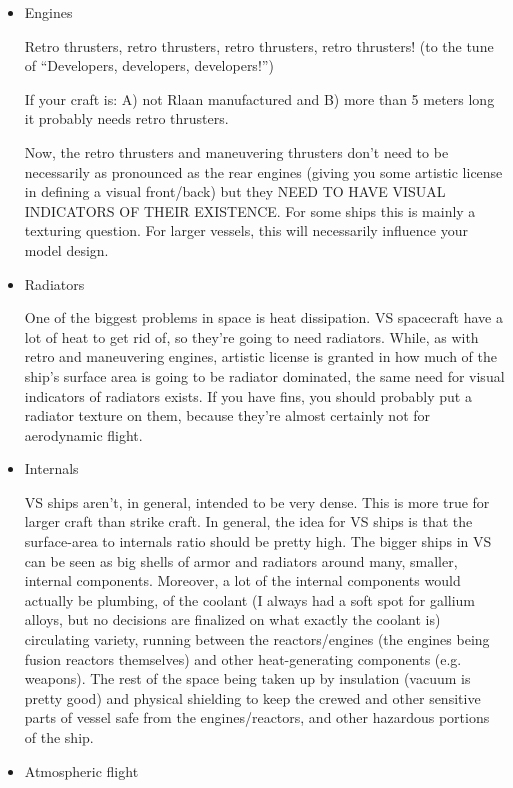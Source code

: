 \begin{itemize}
\item Engines

Retro thrusters, retro thrusters, retro thrusters, retro thrusters!
(to the tune of ``Developers, developers, developers!'')

If your craft is: A) not Rlaan manufactured and B) more than 5 meters
long it probably needs retro thrusters.

Now, the retro thrusters and maneuvering thrusters don't need to be
necessarily as pronounced as the rear engines (giving you some
artistic license in defining a visual front/back) but they NEED TO
HAVE VISUAL INDICATORS OF THEIR EXISTENCE. For some ships this is
mainly a texturing question. For larger vessels, this will necessarily
influence your model design.  

\item Radiators

One of the biggest problems in space is heat dissipation. VS
spacecraft have a lot of heat to get rid of, so they're going to need
radiators. While, as with retro and maneuvering engines, artistic
license is granted in how much of the ship's surface area is going to
be radiator dominated, the same need for visual indicators of
radiators exists. If you have fins, you should probably put a radiator
texture on them, because they're almost certainly not for aerodynamic
flight.  

\item Internals

VS ships aren't, in general, intended to be very dense. This is more
true for larger craft than strike craft. In general, the idea for VS
ships is that the surface-area to internals ratio should be pretty
high. The bigger ships in VS can be seen as big shells of armor and
radiators around many, smaller, internal components. Moreover, a lot
of the internal components would actually be plumbing, of the coolant
(I always had a soft spot for gallium alloys, but no decisions are
finalized on what exactly the coolant is) circulating variety, running
between the reactors/engines (the engines being fusion reactors
themselves) and other heat-generating components (e.g. weapons). The
rest of the space being taken up by insulation (vacuum is pretty good)
and physical shielding to keep the crewed and other sensitive parts of
vessel safe from the engines/reactors, and other hazardous portions of
the ship.  

\item Atmospheric flight


\end{itemize}
